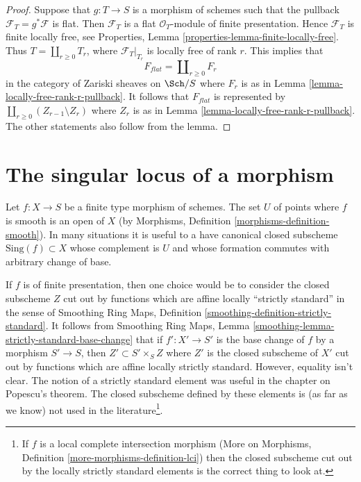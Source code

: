 \begin{proof}
Suppose that $g : T \to S$ is a morphism of schemes such that the pullback
$\mathcal{F}_T = g^*\mathcal{F}$ is flat. Then $\mathcal{F}_T$ is a flat
$\mathcal{O}_T$-module of finite presentation. Hence
$\mathcal{F}_T$ is finite locally free, see
Properties, Lemma \ref{properties-lemma-finite-locally-free}.
Thus $T = \coprod_{r \geq 0} T_r$, where $\mathcal{F}_T|_{T_r}$ is locally
free of rank $r$. This implies that
$$
F_{flat} = \coprod\nolimits_{r \geq 0} F_r
$$
in the category of Zariski sheaves on $\Sch/S$ where $F_r$ is as in
Lemma \ref{lemma-locally-free-rank-r-pullback}. It follows
that $F_{flat}$ is represented by
$\coprod_{r \geq 0} (Z_{r - 1} \setminus Z_r)$ where
$Z_r$ is as in
Lemma \ref{lemma-locally-free-rank-r-pullback}.
The other statements also follow from the lemma.
\end{proof}






\section{The singular locus of a morphism}
\label{section-singular-locus-morphism}

\noindent
Let $f : X \to S$ be a finite type morphism of schemes. The set $U$ of points
where $f$ is smooth is an open of $X$
(by Morphisms, Definition \ref{morphisms-definition-smooth}).
In many situations it is useful to a have canonical closed
subscheme $\text{Sing}(f) \subset X$ whose complement is $U$
and whose formation commutes with arbitrary change of base.

\medskip\noindent
If $f$ is of finite presentation, then one choice would be to consider the
closed subscheme $Z$ cut out by functions which are affine locally
``strictly standard'' in the sense of
Smoothing Ring Maps, Definition \ref{smoothing-definition-strictly-standard}.
It follows from
Smoothing Ring Maps, Lemma \ref{smoothing-lemma-strictly-standard-base-change}
that if $f' : X' \to S'$ is the base change of $f$ by a morphism
$S' \to S$, then $Z' \subset S' \times_S Z$ where $Z'$ is the
closed subscheme of $X'$ cut out by functions which are affine
locally strictly standard. However, equality isn't clear.
The notion of a strictly standard element was useful in the chapter on
Popescu's theorem. The closed subscheme defined by these elements is
(as far as we know) not used in the literature\footnote{If $f$ is a
local complete intersection morphism
(More on Morphisms, Definition \ref{more-morphisms-definition-lci})
then the closed subscheme cut out by the locally strictly standard
elements is the correct thing to look at.}.


